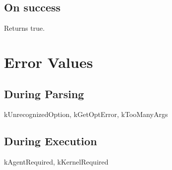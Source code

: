 \documentclass[10pt]{article}
\begin{document}
\subsection*{ On success }


 Returns true. 
\section*{ Error Values }
\subsection*{ During Parsing }


 kUnrecognizedOption, kGetOptError, kTooManyArgs
\subsection*{ During Execution }


 kAgentRequired, kKernelRequired
\end{document}
